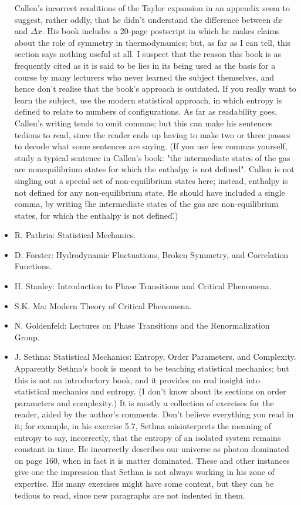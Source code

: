 \documentclass[10pt,a4paper]{book}
\theoremstyle{definition}
\begin{document}
\begin{itemize}
Callen's incorrect renditions of the Taylor expansion in an appendix seem to suggest, rather oddly, that he didn't understand the difference between $dx$ and $\Delta x$.  His book includes a 20-page postscript in which he makes claims about the role of symmetry in thermodynamics; but, as far as I can tell, this section says nothing useful at all.  I suspect that the reason this book is as frequently cited as it is said to be lies in its being used as the basis for a course by many lecturers who never learned the subject themselves, and hence don't realise that the book's approach is outdated.  If you really want to learn the subject, use the modern statistical approach, in which entropy is defined to relate to numbers of configurations.  As far as readability goes, Callen's writing tends to omit commas; but this can make his sentences tedious to read, since the reader ends up having to make two or three passes to decode what some sentences are saying.  (If you use few commas yourself, study a typical sentence in Callen's book: "the intermediate states of the gas are nonequilibrium states for which the enthalpy is not defined".  Callen is not singling out a special set of non-equilibrium states here; instead, enthalpy is not defined for any non-equilibrium state.  He should have included a single comma, by writing \"the intermediate states of the gas are non-equilibrium states, for which the enthalpy is not defined\".)

\item R. Pathria: Statistical Mechanics.
\item D. Forster: Hydrodynamic Fluctuations, Broken Symmetry, and Correlation Functions.
\item H. Stanley: Introduction to Phase Transitions and Critical Phenomena.
\item S.K. Ma: Modern Theory of Critical Phenomena.
\item N. Goldenfeld: Lectures on Phase Transitions and the Renormalization Group.
\item J. Sethna: Statistical Mechanics: Entropy, Order Parameters, and Complexity.
Apparently Sethna's book is meant to be teaching statistical mechanics; but this is not an introductory book, and it provides no real insight into statistical mechanics and entropy.  (I don't know about its sections on order parameters and complexity.)  It is mostly a collection of exercises for the reader, aided by the author's comments.  Don't believe everything you read in it; for example, in his exercise 5.7, Sethna misinterprets the meaning of entropy to say, incorrectly, that the entropy of an isolated system remains constant in time.  He incorrectly describes our universe as photon dominated on page 160, when in fact it is matter dominated.  These and other instances give one the impression that Sethna is not always working in his zone of expertise.  His many exercises might have some content, but they can be tedious to read, since new paragraphs are not indented in them.
\end{itemize}
\end{document}
